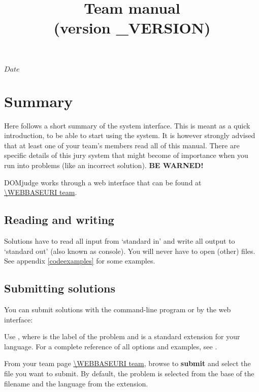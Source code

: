 

\usepackage[english]{babel}

\SVNdate $Date$

\title{Team manual \DOMjudge\\(version \DOMJUDGE_VERSION)}



\begin{titlepage}
\maketitle
\end{titlepage}

\newpage

\section*{Summary}

Here follows a short summary of the system interface. This is meant as
a quick introduction, to be able to start using the system. It is
however strongly advised that at least one of your team's members
read all of this manual. There are specific details of this
jury system that might become of importance when you run into
problems (like an incorrect solution). \textbf{BE WARNED!}

DOMjudge works through a web interface that can be found at\\
\url{\WEBBASEURI team}.

\subsection*{Reading and writing}

Solutions have to read all input from `standard in' and write all
output to `standard out' (also known as console). You will never have
to open (other) files. See appendix \ref{codeexamples} for some
examples.

\subsection*{Submitting solutions}

You can submit solutions with the command-line program  or
by the web interface:
\begin{description}[\breaklabel\setlabelstyle{\bfseries}]
\item[Command-line]
Use , where  is the
label of the problem and  is a standard extension for
your language.  For a complete reference of all options and examples,
see .
\item[Web interface]
From your team page \url{\WEBBASEURI team}, browse to
\textbf{submit} and select the file you want to submit. By default,
the problem is selected from the base of the filename and the language
from the extension.
\end{description}

